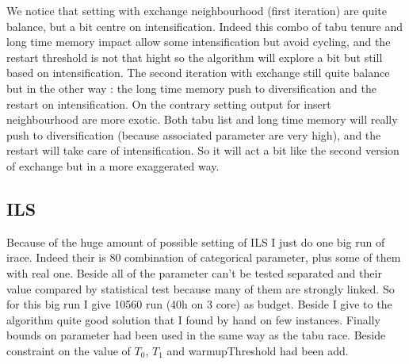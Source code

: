 \documentclass[12pt,a4paper]{article}
\begin{document}
We notice that setting with exchange neighbourhood (first iteration) are quite balance, but a bit centre on intensification. Indeed this combo of tabu tenure and long time memory impact allow some intensification but avoid cycling, and the restart threshold is not that hight so the algorithm will explore a bit but still based on intensification. The second iteration with exchange still quite balance but in the other way : the long time memory push to diversification and the restart on intensification. On the contrary setting output for insert neighbourhood are more exotic. Both tabu list and long time memory will really push to diversification (because associated parameter are very high), and the restart will take care of intensification. So it will act a bit like the second version of exchange but in a more exaggerated way.

\subsection{ILS}

Because of the huge amount of possible setting of ILS I just do one big run of irace. Indeed their is 80 combination of categorical parameter, plus some of them with real one. Beside all of the parameter can't be tested separated and their value compared by statistical test because many of them are strongly linked. So for this big run I give 10560 run (40h on 3 core) as budget. Beside I give to the algorithm quite good solution that I found by hand on few instances. Finally bounds on parameter had been used in the same way as the tabu race. Beside constraint on the value of $T_0$, $T_1$ and warmupThreshold had been add.\\
\end{document}
